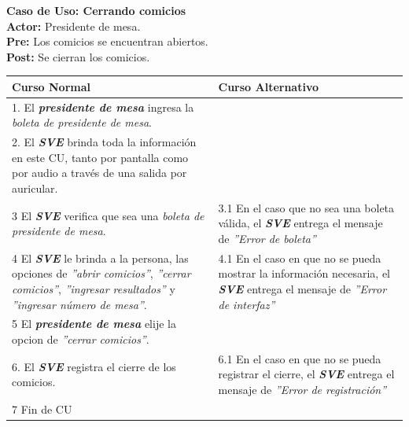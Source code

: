 \documentclass[spanish, 10pt,a4paper]{article}
\numberwithin{equation}{section} %
\begin{document}
\noindent\textbf{Caso de Uso: Cerrando comicios}\\
\textbf{Actor: } Presidente de mesa.\\
\textbf{Pre: } Los comicios se encuentran abiertos.\\
\textbf{Post: } Se cierran los comicios.\\
\begin{table}[H]
  \centering
\bgroup
\def\arraystretch{1.3}
  \begin{tabular}{p{9cm} | p{7cm}}
    \hline
    Curso Normal & Curso Alternativo \\
    \hline
    \hline    
    1. El \textbf{\textit{presidente de mesa}} ingresa la \textit{boleta de presidente de mesa}. 
    & \\
    
    \hline
    2. El \textbf{\textit{SVE}} brinda toda la información en este CU, tanto por pantalla como por audio a través de una salida por auricular.
    &
    \\
    
    \hline
    3 El \textbf{\textit{SVE}} verifica que sea una \textit{boleta de presidente de mesa}.
    & 
    3.1 En el caso que no sea una boleta válida, el \textbf{\textit{SVE}} entrega el mensaje de \textit{''Error de boleta''}
    \\
    
    \hline
    4 El \textbf{\textit{SVE}} le brinda a la persona, las opciones de \textit{''abrir comicios''}, \textit{''cerrar comicios''}, \textit{''ingresar resultados''} y \textit{''ingresar número de mesa''}.
    & 
    4.1 En el caso en que no se pueda mostrar la información necesaria, el \textbf{\textit{SVE}} entrega el mensaje de \textit{''Error de interfaz''}
    \\
    
    \hline
    5 El \textbf{\textit{presidente de mesa}} elije la opcion de \textit{''cerrar comicios''}.
    & \\
    
    \hline
    6. El \textbf{\textit{SVE}} registra el cierre de los comicios.
    &
    6.1 En el caso en que no se pueda registrar el cierre, el \textbf{\textit{SVE}} entrega el mensaje de \textit{''Error de registración''}
    \\
    
    \hline
    7 Fin de CU
    & \\
    \hline
  \end{tabular}
\egroup
\end{table}
\end{document}
